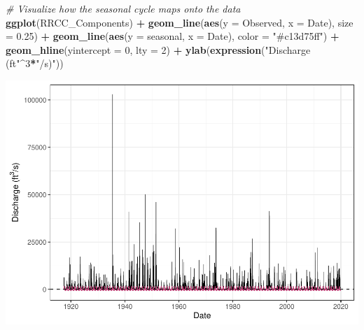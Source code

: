 \documentclass[12pt,]{article}
\newenvironment{Shaded}{\begin{snugshade}}{\end{snugshade}}
\newcommand{\CommentTok}[1]{\textcolor[rgb]{0.56,0.35,0.01}{\textit{#1}}}
\newcommand{\DataTypeTok}[1]{\textcolor[rgb]{0.13,0.29,0.53}{#1}}
\newcommand{\DecValTok}[1]{\textcolor[rgb]{0.00,0.00,0.81}{#1}}
\newcommand{\FloatTok}[1]{\textcolor[rgb]{0.00,0.00,0.81}{#1}}
\newcommand{\KeywordTok}[1]{\textcolor[rgb]{0.13,0.29,0.53}{\textbf{#1}}}
\newcommand{\NormalTok}[1]{#1}
\newcommand{\OperatorTok}[1]{\textcolor[rgb]{0.81,0.36,0.00}{\textbf{#1}}}
\newcommand{\StringTok}[1]{\textcolor[rgb]{0.31,0.60,0.02}{#1}}
\begin{document}
\begin{Shaded}
\begin{Highlighting}[]
\CommentTok{# Visualize how the seasonal cycle maps onto the data}
\KeywordTok{ggplot}\NormalTok{(RRCC_Components) }\OperatorTok{+}
\StringTok{  }\KeywordTok{geom_line}\NormalTok{(}\KeywordTok{aes}\NormalTok{(}\DataTypeTok{y =}\NormalTok{ Observed, }\DataTypeTok{x =}\NormalTok{ Date),  }\DataTypeTok{size =} \FloatTok{0.25}\NormalTok{) }\OperatorTok{+}
\StringTok{  }\KeywordTok{geom_line}\NormalTok{(}\KeywordTok{aes}\NormalTok{(}\DataTypeTok{y =}\NormalTok{ seasonal, }\DataTypeTok{x =}\NormalTok{ Date), }\DataTypeTok{color =} \StringTok{"#c13d75ff"}\NormalTok{) }\OperatorTok{+}
\StringTok{  }\KeywordTok{geom_hline}\NormalTok{(}\DataTypeTok{yintercept =} \DecValTok{0}\NormalTok{, }\DataTypeTok{lty =} \DecValTok{2}\NormalTok{) }\OperatorTok{+}
\StringTok{  }\KeywordTok{ylab}\NormalTok{(}\KeywordTok{expression}\NormalTok{(}\StringTok{"Discharge (ft"}\OperatorTok{^}\DecValTok{3}\OperatorTok{*}\StringTok{"/s)"}\NormalTok{))}
\end{Highlighting}
\end{Shaded}

\includegraphics{Project_Template_files/figure-latex/unnamed-chunk-6-22.pdf}

\begin{Shaded}
\end{Shaded}
\end{document}
